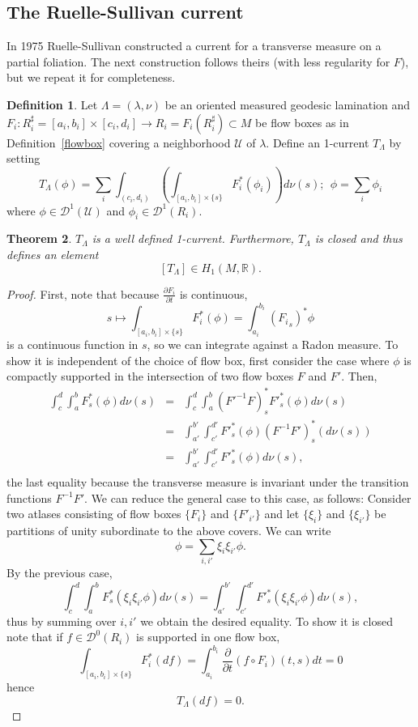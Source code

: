 \documentclass{ip-journal}
\newtheorem{theorem}{Theorem}[section]
\theoremstyle{definition}
\newtheorem{definition}[theorem]{Definition}
\numberwithin{equation}{section}
\newcommand{\R}{\mathbb R}
\begin{document}
 \subsection{The Ruelle-Sullivan current} 
 
 In 1975 Ruelle-Sullivan \cite{sullivan} constructed a current for a transverse measure on a partial foliation. The next construction follows theirs (with less regularity for $F$), but we repeat it for completeness.

 \begin{definition}\label{integration} Let $\Lambda=(\lambda, \nu)$ be an oriented measured geodesic lamination and $F_i: R_i^\sharp=[a_i,b_i] \times [c_i,d_i] \rightarrow R_i= F_i(R_i^\sharp) \subset M$ be flow boxes as in Definition~\ref{flowbox} covering a neighborhood $\mathcal U$ of $\lambda$.
 Define an 1-current
 $T_\Lambda$  by setting
 \[
 T_\Lambda(\phi)=\sum_i \int_{(c_i,d_i)}\left(\int_{[a_i,b_i] \times \{ s\}}F_i^*(\phi_i) \right)d\nu(s); \ \ \phi=\sum_i \phi_i
 \]
 where $\phi \in \mathcal D^1(\mathcal U)$ and $\phi_i \in \mathcal D^1(R_i)$.
 \end{definition}
 
 \begin{theorem}\label{welldefcur} $T_\Lambda$ is a well defined 1-current. Furthermore, $T_{\Lambda} $ is closed and thus defines an element
 \[
 [T_{\Lambda}] \in H_1(M, \R).
 \]
 \end{theorem}
 \begin{proof}
 First, note that because $\frac{\partial F_i}{\partial t}$ is continuous, 
 \[
 s \mapsto \int_{[a_i,b_i] \times \{ s\}}F_i^*(\phi)= \int_{a_i}^{b_i} ({F_i}_s)^*\phi
 \]
 is a continuous function in $s$, so
 we can integrate against a Radon measure. To show it is independent of the choice of flow box, first consider the case where $ \phi$ is compactly supported in the intersection of two flow boxes $F$ and $F'$.
 Then,
 \begin{eqnarray*}
 \int_c^d\int_a^bF_s^*(\phi)d\nu(s)&=&\int_c^d\int_a^b({F'}^{-1}F)_s^*{F'}_s^*(\phi)d\nu(s)\\
 &=&\int_{a'}^{b'}\int_{c'}^{d'}{F'}_s^*(\phi)({F}^{-1}F')_s^*(d\nu(s))\\
 &=&\int_{a'}^{b'}\int_{c'}^{d'}{F'}_s^*(\phi)d\nu(s),\\
 \end{eqnarray*}
 the last equality because the transverse measure is invariant under the transition functions ${F}^{-1}F'$.
 We can reduce the general case to this case, as follows: Consider two atlases consisting of flow boxes $\{F_i\}$ and $\{F'_{i'}\}$ and let  $\{\xi_i\}$ and $\{\xi_{i'}\}$ be partitions of unity subordinate to the above covers. We can write 
 \[
 \phi=\sum_{i,i'}\xi_i\xi_{i'} \phi.
 \]
By the previous case,
 \[
 \int_c^d\int_a^bF_s^*(\xi_i\xi_{i'}\phi)d\nu(s)=\int_{a'}^{b'}\int_{c'}^{d'}{F'}_s^*(\xi_i\xi_{i'}\phi)d\nu(s),
 \]
 thus by summing over $i,i'$ we obtain the desired equality.
 To show it is closed note that if $f \in \mathcal D^0(R_i)$ is supported in one flow box, 
 \[
 \int_{[a_i,b_i] \times \{ s\}}F_i^*(df)=\int_{a_i}^{b_i} \frac{\partial}{\partial t} (f \circ F_i)(t,s)dt=0
 \]
 hence
 \[
 T_\Lambda (df)=0.
 \] 
 \end{proof}
 
\end{document}
